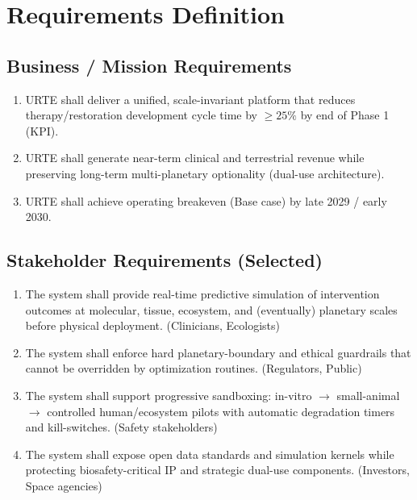 \documentclass[11pt,a4paper]{report}
\begin{document}
\chapter{Requirements Definition}

\section{Business / Mission Requirements}

\begin{enumerate}[label=BR-\arabic*]
    \item URTE shall deliver a unified, scale-invariant platform that reduces therapy/restoration development cycle time by $\geq 25\%$ by end of Phase 1 (KPI).
    \item URTE shall generate near-term clinical and terrestrial revenue while preserving long-term multi-planetary optionality (dual-use architecture).
    \item URTE shall achieve operating breakeven (Base case) by late 2029 / early 2030.
\end{enumerate}

\section{Stakeholder Requirements (Selected)}

\begin{enumerate}[label=SR-\arabic*]
    \item The system shall provide real-time predictive simulation of intervention outcomes at molecular, tissue, ecosystem, and (eventually) planetary scales before physical deployment. (Clinicians, Ecologists)
    \item The system shall enforce hard planetary-boundary and ethical guardrails that cannot be overridden by optimization routines. (Regulators, Public)
    \item The system shall support progressive sandboxing: in-vitro $\to$ small-animal $\to$ controlled human/ecosystem pilots with automatic degradation timers and kill-switches. (Safety stakeholders)
    \item The system shall expose open data standards and simulation kernels while protecting biosafety-critical IP and strategic dual-use components. (Investors, Space agencies)
\end{enumerate}
\end{document}
